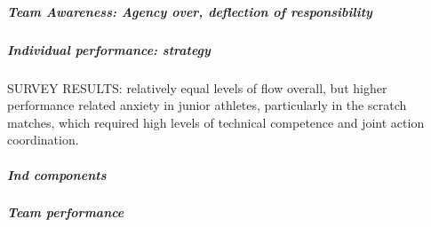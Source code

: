 \begin{CJK}{UTF8}{gbsn}

            \subparagraph{Team Awareness: Agency over, deflection of responsibility}

          \subparagraph{Individual performance: strategy}








        SURVEY RESULTS: relatively equal levels of flow overall, but higher performance related anxiety in junior athletes, particularly in the scratch matches, which required high levels of technical competence and joint action coordination.









            \subparagraph{Ind components}
          \subparagraph{Team performance}


\end{CJK}
